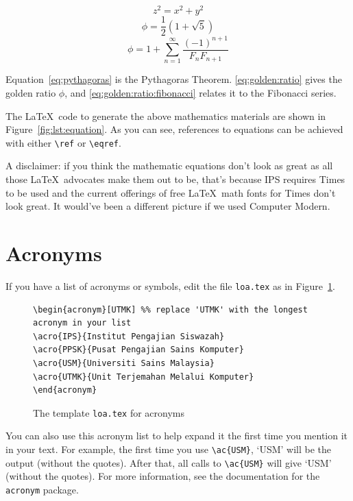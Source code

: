 \begin{equation}\label{eq:pythagoras}
z^2 = x^2 + y^2
\end{equation}
\begin{equation}\label{eq:golden:ratio}
\phi = \frac{1}{2} (1 + \sqrt{5})
\end{equation}
\begin{equation}\label{eq:golden:ratio:fibonacci}
\phi = 1 + \sum ^ {\infty} _ {n=1}
                \frac{ (-1) ^ {n+1} }{ F_n F_{n+1} }
\end{equation}

Equation~\ref{eq:pythagoras} is the Pythagoras Theorem. \eqref{eq:golden:ratio} gives the golden ratio $\phi$, and \eqref{eq:golden:ratio:fibonacci} relates it to the Fibonacci series.

The \LaTeX\ code to generate the above mathematics materials are shown in Figure~\ref{fig:lst:equation}.  As you can see, references to equations can be achieved with either \verb|\ref| or \verb|\eqref|.

A disclaimer: if you think the mathematic equations don't look as great as all those \LaTeX\ advocates make them out to be, that's because IPS requires Times to be used and the current offerings of free \LaTeX\ math fonts for Times don't look great. It would've been a different picture if we used Computer Modern.

\section{Acronyms}
\acresetall
If you have a list of acronyms or symbols, edit the file \verb|loa.tex| as in Figure~\ref{fig:acronym}.

\begin{figure}[hbt!]
\begin{lstlisting}
\begin{acronym}[UTMK] %% replace 'UTMK' with the longest acronym in your list
\acro{IPS}{Institut Pengajian Siswazah}
\acro{PPSK}{Pusat Pengajian Sains Komputer}
\acro{USM}{Universiti Sains Malaysia}
\acro{UTMK}{Unit Terjemahan Melalui Komputer}
\end{acronym}
\end{lstlisting}
\caption{The template \texttt{loa.tex} for acronyms}\label{fig:acronym}
\end{figure}

You can also use this acronym list to help expand it the first time you mention it in your text.  For example, the first time you use \verb|\ac{USM}|, `\ac{USM}' will be the output (without the quotes).  After that, all calls to \verb|\ac{USM}| will give `\ac{USM}' (without the quotes).  For more information, see the documentation for the \texttt{acronym} package.


